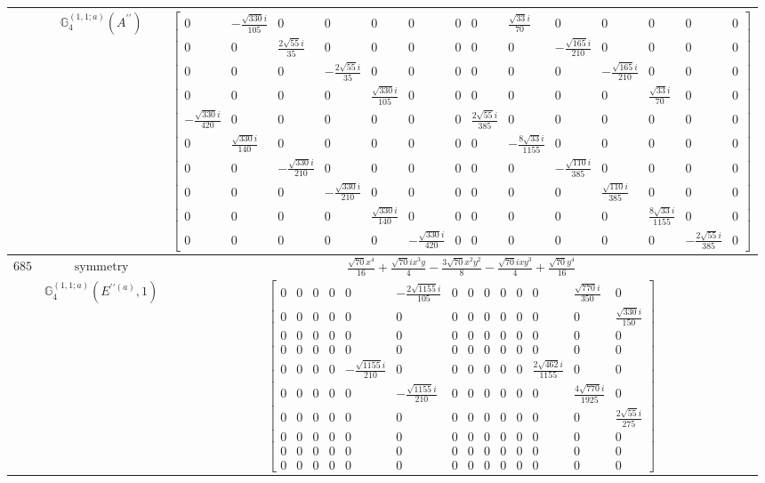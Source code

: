 \documentclass[fleqn,8pt,landscape]{jsarticle}
\begin{document}
\begin{longtable}{ccc}
$  $ & $ \mathbb{G}_{4}^{(1,1;a)}(A^{\prime\prime}) $ & $ \begin{bmatrix} 0 & - \frac{\sqrt{330} i}{105} & 0 & 0 & 0 & 0 & 0 & 0 & \frac{\sqrt{33} i}{70} & 0 & 0 & 0 & 0 & 0 \\ 0 & 0 & \frac{2 \sqrt{55} i}{35} & 0 & 0 & 0 & 0 & 0 & 0 & - \frac{\sqrt{165} i}{210} & 0 & 0 & 0 & 0 \\ 0 & 0 & 0 & - \frac{2 \sqrt{55} i}{35} & 0 & 0 & 0 & 0 & 0 & 0 & - \frac{\sqrt{165} i}{210} & 0 & 0 & 0 \\ 0 & 0 & 0 & 0 & \frac{\sqrt{330} i}{105} & 0 & 0 & 0 & 0 & 0 & 0 & \frac{\sqrt{33} i}{70} & 0 & 0 \\ - \frac{\sqrt{330} i}{420} & 0 & 0 & 0 & 0 & 0 & 0 & \frac{2 \sqrt{55} i}{385} & 0 & 0 & 0 & 0 & 0 & 0 \\ 0 & \frac{\sqrt{330} i}{140} & 0 & 0 & 0 & 0 & 0 & 0 & - \frac{8 \sqrt{33} i}{1155} & 0 & 0 & 0 & 0 & 0 \\ 0 & 0 & - \frac{\sqrt{330} i}{210} & 0 & 0 & 0 & 0 & 0 & 0 & - \frac{\sqrt{110} i}{385} & 0 & 0 & 0 & 0 \\ 0 & 0 & 0 & - \frac{\sqrt{330} i}{210} & 0 & 0 & 0 & 0 & 0 & 0 & \frac{\sqrt{110} i}{385} & 0 & 0 & 0 \\ 0 & 0 & 0 & 0 & \frac{\sqrt{330} i}{140} & 0 & 0 & 0 & 0 & 0 & 0 & \frac{8 \sqrt{33} i}{1155} & 0 & 0 \\ 0 & 0 & 0 & 0 & 0 & - \frac{\sqrt{330} i}{420} & 0 & 0 & 0 & 0 & 0 & 0 & - \frac{2 \sqrt{55} i}{385} & 0 \end{bmatrix} $ \\ \hline
$ 685 $ & $ \text{symmetry} $ & $ \frac{\sqrt{70} x^{4}}{16} + \frac{\sqrt{70} i x^{3} y}{4} - \frac{3 \sqrt{70} x^{2} y^{2}}{8} - \frac{\sqrt{70} i x y^{3}}{4} + \frac{\sqrt{70} y^{4}}{16} $ \\
$  $ & $ \mathbb{G}_{4}^{(1,1;a)}(E^{\prime\prime(a)},1) $ & $ \begin{bmatrix} 0 & 0 & 0 & 0 & 0 & - \frac{2 \sqrt{1155} i}{105} & 0 & 0 & 0 & 0 & 0 & 0 & \frac{\sqrt{770} i}{350} & 0 \\ 0 & 0 & 0 & 0 & 0 & 0 & 0 & 0 & 0 & 0 & 0 & 0 & 0 & \frac{\sqrt{330} i}{150} \\ 0 & 0 & 0 & 0 & 0 & 0 & 0 & 0 & 0 & 0 & 0 & 0 & 0 & 0 \\ 0 & 0 & 0 & 0 & 0 & 0 & 0 & 0 & 0 & 0 & 0 & 0 & 0 & 0 \\ 0 & 0 & 0 & 0 & - \frac{\sqrt{1155} i}{210} & 0 & 0 & 0 & 0 & 0 & 0 & \frac{2 \sqrt{462} i}{1155} & 0 & 0 \\ 0 & 0 & 0 & 0 & 0 & - \frac{\sqrt{1155} i}{210} & 0 & 0 & 0 & 0 & 0 & 0 & \frac{4 \sqrt{770} i}{1925} & 0 \\ 0 & 0 & 0 & 0 & 0 & 0 & 0 & 0 & 0 & 0 & 0 & 0 & 0 & \frac{2 \sqrt{55} i}{275} \\ 0 & 0 & 0 & 0 & 0 & 0 & 0 & 0 & 0 & 0 & 0 & 0 & 0 & 0 \\ 0 & 0 & 0 & 0 & 0 & 0 & 0 & 0 & 0 & 0 & 0 & 0 & 0 & 0 \\ 0 & 0 & 0 & 0 & 0 & 0 & 0 & 0 & 0 & 0 & 0 & 0 & 0 & 0 \end{bmatrix} $ \\ \hline

\end{longtable}
\end{document}
